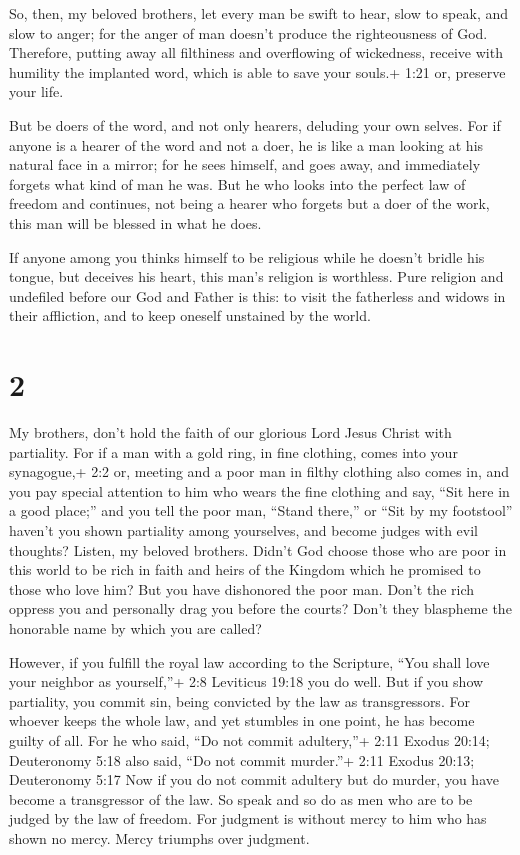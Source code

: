  So, then, my beloved brothers, let every man be swift to
hear, slow to speak, and slow to anger;  for the anger of
man doesn't produce the righteousness of God.  Therefore,
putting away all filthiness and overflowing of wickedness, receive with
humility the implanted word, which is able to save your souls.+ 1:21 or,
preserve your life.

 But be doers of the word, and not only hearers, deluding
your own selves.  For if anyone is a hearer of the word and
not a doer, he is like a man looking at his natural face in a mirror;
 for he sees himself, and goes away, and immediately
forgets what kind of man he was.  But he who looks into the
perfect law of freedom and continues, not being a hearer who forgets but
a doer of the work, this man will be blessed in what he does.

 If anyone among you thinks himself to be religious while
he doesn't bridle his tongue, but deceives his heart, this man's
religion is worthless.  Pure religion and undefiled before
our God and Father is this: to visit the fatherless and widows in their
affliction, and to keep oneself unstained by the world.

\hypertarget{section-1}{%
\section{2}\label{section-1}}

 My brothers, don't hold the faith of our glorious Lord
Jesus Christ with partiality.  For if a man with a gold
ring, in fine clothing, comes into your synagogue,+ 2:2 or, meeting and
a poor man in filthy clothing also comes in,  and you pay
special attention to him who wears the fine clothing and say, ``Sit here
in a good place;'' and you tell the poor man, ``Stand there,'' or ``Sit
by my footstool''  haven't you shown partiality among
yourselves, and become judges with evil thoughts?  Listen,
my beloved brothers. Didn't God choose those who are poor in this world
to be rich in faith and heirs of the Kingdom which he promised to those
who love him?  But you have dishonored the poor man. Don't
the rich oppress you and personally drag you before the courts?
 Don't they blaspheme the honorable name by which you are
called?

 However, if you fulfill the royal law according to the
Scripture, ``You shall love your neighbor as yourself,''+ 2:8 Leviticus
19:18 you do well.  But if you show partiality, you commit
sin, being convicted by the law as transgressors.  For
whoever keeps the whole law, and yet stumbles in one point, he has
become guilty of all.  For he who said, ``Do not commit
adultery,''+ 2:11 Exodus 20:14; Deuteronomy 5:18 also said, ``Do not
commit murder.''+ 2:11 Exodus 20:13; Deuteronomy 5:17 Now if you do not
commit adultery but do murder, you have become a transgressor of the
law.  So speak and so do as men who are to be judged by the
law of freedom.  For judgment is without mercy to him who
has shown no mercy. Mercy triumphs over judgment.

